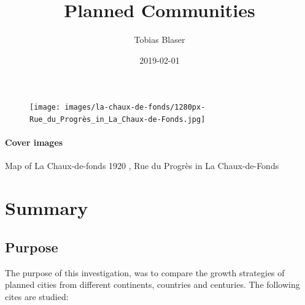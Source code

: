 \documentclass{article}
\title{Planned Communities}
\date{2019-02-01}
\author{Tobias Blaser}
\begin{document}
	
	\maketitle	
 	
	\begin{figure}[b!]
 		\texttt{[image: images/la-chaux-de-fonds/1280px-Rue\_du\_Progrès\_in\_La\_Chaux-de-Fonds.jpg]}
 	\end{figure}
 	
 	\restoregeometry	
	
	
	
	\clearpage
	\tableofcontents
	
	\paragraph{Cover images}
	Map of La Chaux-de-fonds 1920 \cite{MapGeoAdmin:LaChauxDeFonds1920},
	Rue du Progrès in La Chaux-de-Fonds \cite{Wikimedia:RueDuProgressLaChauxDeFonds}
	
	
	
	\clearpage
	\section{Summary}
		\subsection{Purpose}
		The purpose of this investigation, was to compare the growth strategies of planned cities from different continents, countries and centuries. The following cites are studied:
		
\end{document}
